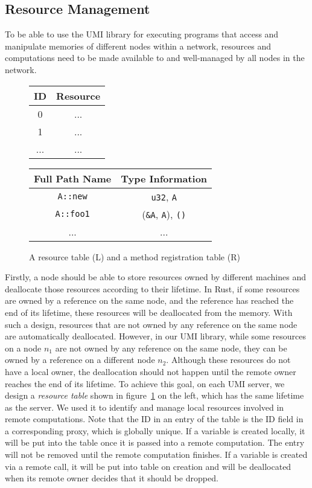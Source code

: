 \subsection{Resource Management}
\label{chap3:impl:resource}
To be able to use the UMI library for executing programs that access and manipulate memories of different nodes within a network, resources and computations need to be made available to and well-managed by all nodes in the network.
\begin{figure}[!t]
\centering
\begin{tabular}{ |c|c| } 
\hline
\textbf{ID} & \textbf{Resource} \\\hline
0 & ... \\\hline
1 & ... \\\hline
... & ... \\
\hline
\end{tabular}
\quad
\begin{tabular}{ |c|c| } 
\hline
\textbf{Full Path Name} & \textbf{Type Information} \\\hline
\texttt{A::new} & \texttt{u32}, \texttt{A} \\\hline
\texttt{A::foo1} &  (\texttt{\&A}, \texttt{A}), \texttt{()} \\\hline
... & ... \\
\hline
\end{tabular}
\caption{A resource table (L) and a method registration table (R)}
\label{chap3:impl:tables}
\end{figure}

Firstly, a node should be able to store resources owned by different machines and deallocate those resources according to their lifetime.
In Rust, if some resources are owned by a reference on the same node, and the reference has reached the end of its lifetime, these resources will be deallocated from the memory. With such a design, resources that are not owned by any reference on the same node are automatically deallocated. However, in our UMI library, while some resources on a node $n_1$ are not owned by any reference on the same node, they can be owned by a reference on a different node $n_2$. Although these resources do not have a local owner, the deallocation should not happen until the remote owner reaches the end of its lifetime. 
To achieve this goal, on each UMI server, we design a \emph{resource table} shown in figure~\ref{chap3:impl:tables} on the left, which has the same lifetime as the server. We used it to identify and manage local resources involved in remote computations. Note that the ID in an entry of the table is the ID field in a corresponding proxy, which is globally unique.
If a variable is created locally, it will be put into the table once it is passed into a remote computation. The entry will not be removed until the remote computation finishes. If a variable is created via a remote call, it will be put into table on creation and will be deallocated when its remote owner decides that it should be dropped.

